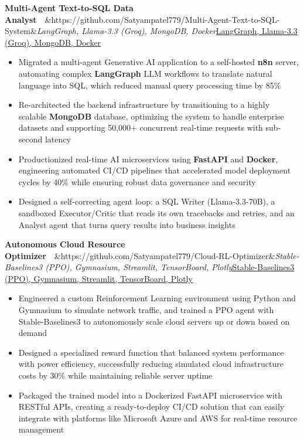 \documentclass[letterpaper,10pt]{article}
\newcommand{\project}[3]{%
  \Needspace{4\baselineskip}\vspace{2pt}\textbf{#1}\ \ \ifx&#3&\textit{#2}\else\href{#3}{\underline{#2}}\fi\par\vspace{-1pt}}
\begin{document}
\project{Multi-Agent Text-to-SQL Data Analyst}{LangGraph, Llama-3.3 (Groq), MongoDB, Docker}{https://github.com/Satyampatel779/Multi-Agent-Text-to-SQL-System}
\begin{itemize}
  \item Migrated a multi-agent Generative AI application to a self-hosted \textbf{n8n} server, automating complex
        \textbf{LangGraph} LLM workflows to translate natural language into SQL, which reduced manual query processing
        time by 85\%
  \item Re-architected the backend infrastructure by transitioning to a highly scalable \textbf{MongoDB} database,
        optimizing the system to handle enterprise datasets and supporting 50,000+ concurrent real-time requests with
        sub-second latency
  \item Productionized real-time AI microservices using \textbf{FastAPI} and \textbf{Docker}, engineering automated CI/CD
        pipelines that accelerated model deployment cycles by 40\% while ensuring robust data governance and security
  \item Designed a self-correcting agent loop: a SQL Writer (Llama-3.3-70B), a sandboxed Executor/Critic that reads its own
        tracebacks and retries, and an Analyst agent that turns query results into business insights
\end{itemize}

\project{Autonomous Cloud Resource Optimizer}{Stable-Baselines3 (PPO), Gymnasium, Streamlit, TensorBoard, Plotly}{https://github.com/Satyampatel779/Cloud-RL-Optimizer}
\begin{itemize}
  \item Engineered a custom Reinforcement Learning environment using Python and Gymnasium to simulate network traffic, and
        trained a PPO agent with Stable-Baselines3 to autonomously scale cloud servers up or down based on demand
  \item Designed a specialized reward function that balanced system performance with power efficiency, successfully
        reducing simulated cloud infrastructure costs by 30\% while maintaining reliable server uptime
  \item Packaged the trained model into a Dockerized FastAPI microservice with RESTful APIs, creating a ready-to-deploy
        CI/CD solution that can easily integrate with platforms like Microsoft Azure and AWS for real-time resource management
\end{itemize}
\end{document}
